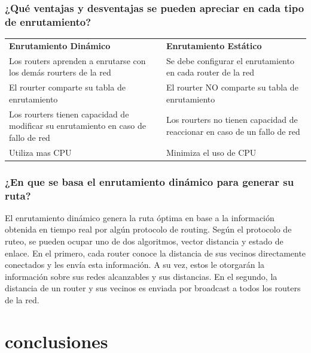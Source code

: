 ﻿\documentclass[spanish]{udpreport}
\begin{document}
\subsection{¿Qué ventajas y desventajas se pueden apreciar en cada tipo de enrutamiento?}
\begin{table}[H]
\centering
\begin{tabular}{p{8cm}|p{8cm}}
\textbf{Enrutamiento Dinámico} & \textbf{Enrutamiento Estático} \\
     Los routers aprenden a enrutarse con los demás rourters de la red &
     Se debe configurar el enrutamiento en cada router de la red \\
     El rourter comparte su tabla de enrutamiento  & 
     El rourter NO comparte su tabla de enrutamiento  \\
     Los rourters tienen capacidad de modificar su enrutamiento en caso de fallo de red &
     Los rourters no tienen capacidad de reaccionar en caso de un fallo de red \\
     Utiliza mas CPU & 
     Minimiza el uso de CPU \\    
\end{tabular}
\end{table}

\subsection{¿En que se basa el enrutamiento dinámico para generar su ruta?}
El enrutamiento dinámico genera la ruta óptima en base a la información obtenida en tiempo real por algún protocolo de routing. Según el protocolo de ruteo, se pueden ocupar uno de dos algoritmos, vector distancia y estado de enlace. En el primero, cada router conoce la distancia de sus vecinos directamente conectados y les envía esta información. A su vez, estos le otorgarán la información sobre sus redes alcanzables y sus distancias. En el segundo, la distancia de un router y sus vecinos es enviada por broadcast a todos los routers de la red.

\chapter{conclusiones}
\end{document}
